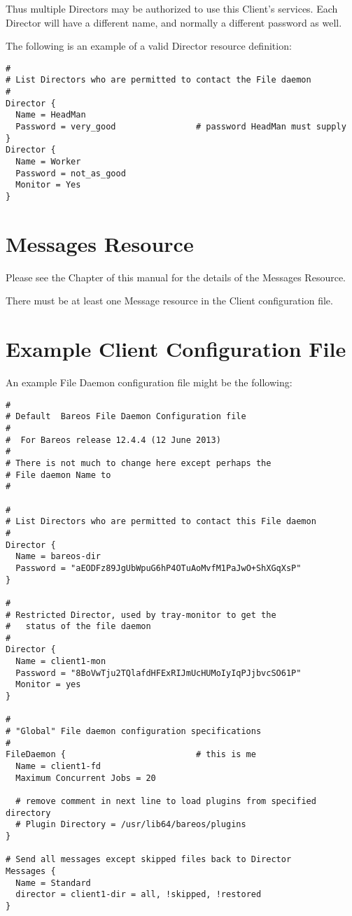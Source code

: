 Thus multiple Directors may be authorized to use this Client's services. Each
Director will have a different name, and normally a different password as
well.

The following is an example of a valid Director resource definition:

\footnotesize
\begin{verbatim}
#
# List Directors who are permitted to contact the File daemon
#
Director {
  Name = HeadMan
  Password = very_good                # password HeadMan must supply
}
Director {
  Name = Worker
  Password = not_as_good
  Monitor = Yes
}
\end{verbatim}
\normalsize

\section{Messages Resource}
\label{MessagesResource3}

Please see the
 Chapter of this
manual for the details of the Messages Resource.

There must be at least one Message resource in the Client configuration file.

\section{Example Client Configuration File}
\label{SampleClientConfiguration}

An example File Daemon configuration file might be the following:

\footnotesize
\begin{verbatim}
#
# Default  Bareos File Daemon Configuration file
#
#  For Bareos release 12.4.4 (12 June 2013)
#
# There is not much to change here except perhaps the
# File daemon Name to
#

#
# List Directors who are permitted to contact this File daemon
#
Director {
  Name = bareos-dir
  Password = "aEODFz89JgUbWpuG6hP4OTuAoMvfM1PaJwO+ShXGqXsP"
}

#
# Restricted Director, used by tray-monitor to get the
#   status of the file daemon
#
Director {
  Name = client1-mon
  Password = "8BoVwTju2TQlafdHFExRIJmUcHUMoIyIqPJjbvcSO61P"
  Monitor = yes
}

#
# "Global" File daemon configuration specifications
#
FileDaemon {                          # this is me
  Name = client1-fd
  Maximum Concurrent Jobs = 20

  # remove comment in next line to load plugins from specified directory
  # Plugin Directory = /usr/lib64/bareos/plugins
}

# Send all messages except skipped files back to Director
Messages {
  Name = Standard
  director = client1-dir = all, !skipped, !restored
}
\end{verbatim}
\normalsize
